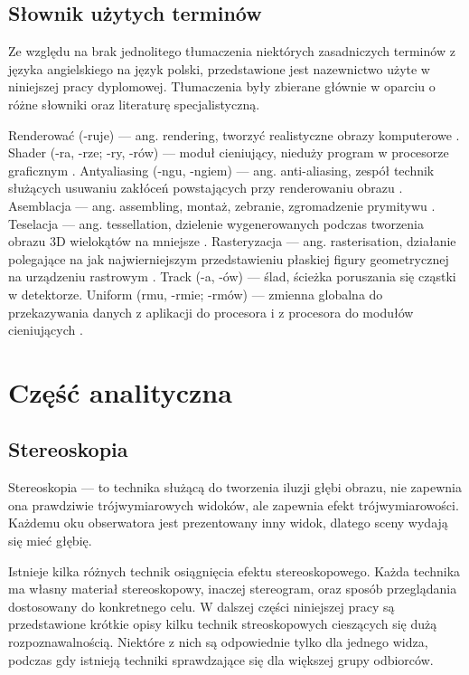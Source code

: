 \subsection{Słownik użytych terminów}
Ze względu na brak jednolitego tłumaczenia niektórych zasadniczych terminów z języka angielskiego na język polski, przedstawione jest nazewnictwo użyte w niniejszej pracy dyplomowej. Tłumaczenia były zbierane głównie w oparciu o różne słowniki oraz literaturę specjalistyczną.
\begin{itemize}
\itemi Renderować (-ruje) --- ang. rendering, tworzyć realistyczne obrazy komputerowe \cite{pwn}.
\itemi Shader (-ra, -rze; -ry, -rów) --- moduł cieniujący, nieduży program w procesorze graficznym \cite{slownik}.
\itemi Antyaliasing (-ngu, -ngiem)  --- ang. anti-aliasing, zespół technik służących usuwaniu zakłóceń powstających przy renderowaniu obrazu \cite{wprowadzeniedografiki}.
\itemi Asemblacja --- ang. assembling, montaż, zebranie, zgromadzenie prymitywu \cite{slownik}.
\itemi Teselacja --- ang. tessellation, dzielenie wygenerowanych podczas tworzenia obrazu 3D wielokątów na mniejsze \cite{slownik}.
\itemi Rasteryzacja --- ang. rasterisation, działanie polegające na jak najwierniejszym przedstawieniu płaskiej figury geometrycznej na urządzeniu rastrowym \cite{slownik}.
\itemi Track (-a, -ów) --- ślad, ścieżka poruszania się cząstki w detektorze.
\itemi Uniform (rmu, -rmie; -rmów) --- zmienna globalna do przekazywania danych z aplikacji do procesora i z procesora do modułów cieniujących \cite{slownik}.
\end{itemize}
\newpage
\section[Część analityczna]{Część analityczna}
\subsection{Stereoskopia}
Stereoskopia --- to technika służącą do tworzenia iluzji głębi obrazu, nie zapewnia ona prawdziwie trójwymiarowych widoków, ale zapewnia efekt trójwymiarowości. Każdemu oku obserwatora jest prezentowany inny widok, dlatego sceny wydają się mieć głębię.

Istnieje kilka różnych technik osiągnięcia efektu stereoskopowego. Każda technika ma własny materiał stereoskopowy, inaczej stereogram, oraz sposób przeglądania dostosowany do konkretnego celu. W dalszej części niniejszej pracy są przedstawione krótkie opisy kilku technik streoskopowych cieszących się dużą rozpoznawalnością. Niektóre z nich są odpowiednie tylko dla jednego widza, podczas gdy istnieją techniki sprawdzające się dla większej grupy odbiorców.
